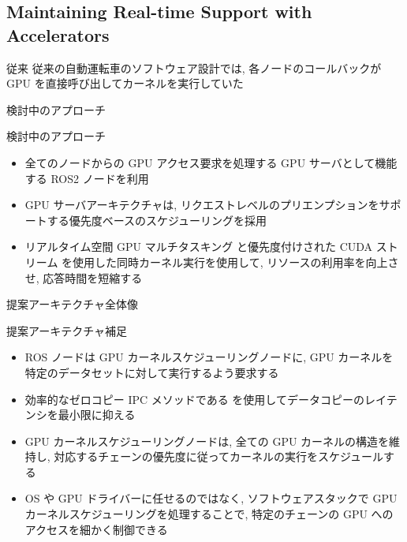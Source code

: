\subsection{Maintaining Real-time Support with Accelerators}
\label{ssec: maintaining real-time support with accelerators}

\begin{frame}{従来}
    従来の自動運転車のソフトウェア設計では, 各ノードのコールバックが GPU を直接呼び出してカーネルを実行していた
\end{frame}

\begin{frame}{検討中のアプローチ}
    \begin{block}{検討中のアプローチ}
        \setlength{\linewidth}{0.98\columnwidth}
        \begin{itemize}
            \item 全てのノードからの GPU アクセス要求を処理する GPU サーバとして機能する ROS2 ノードを利用
            \item GPU サーバアーキテクチャは, リクエストレベルのプリエンプションをサポートする優先度ベースのスケジューリングを採用
            \item リアルタイム空間 GPU マルチタスキング \cite{saha2019stgm, wang2021balancing} と優先度付けされた CUDA ストリーム \cite{xiang2019pipelined} を使用した同時カーネル実行を使用して, リソースの利用率を向上させ, 応答時間を短縮する
        \end{itemize}
    \end{block}
\end{frame}

\begin{frame}{提案アーキテクチャ全体像}
\end{frame}

\begin{frame}{提案アーキテクチャ補足}
    \begin{itemize}
        \item ROS ノードは GPU カーネルスケジューリングノードに, GPU カーネルを特定のデータセットに対して実行するよう要求する
        \item 効率的なゼロコピー IPC メソッドである  を使用してデータコピーのレイテンシを最小限に抑える
        \item GPU カーネルスケジューリングノードは, 全ての GPU カーネルの構造を維持し, 対応するチェーンの優先度に従ってカーネルの実行をスケジュールする
        \item OS や GPU ドライバーに任せるのではなく, ソフトウェアスタックで GPU カーネルスケジューリングを処理することで, 特定のチェーンの GPU へのアクセスを細かく制御できる
    \end{itemize}
\end{frame}
